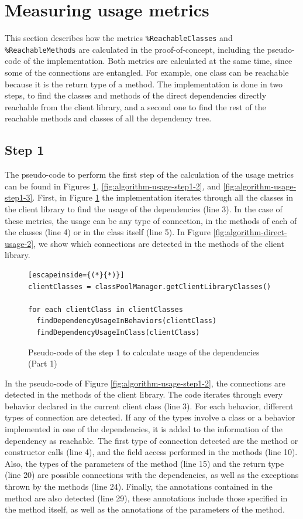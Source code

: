\section{Measuring usage metrics}
This section describes how the metrics \texttt{\%ReachableClasses} and \texttt{\%ReachableMethods} are calculated in the proof-of-concept, including the pseudo-code of the implementation. Both metrics are calculated at the same time, since some of the connections are entangled. For example, one class can be reachable because it is the return type of a method. The implementation is done in two steps, to find the classes and methods of the direct dependencies directly reachable from the client library, and a second one to find the rest of the reachable methods and classes of all the dependency tree.

\subsection{Step 1}
The pseudo-code to perform the first step of the calculation of the usage metrics can be found in Figures \ref{fig:algorithm-usage-step1-1}, \ref{fig:algorithm-usage-step1-2}, and \ref{fig:algorithm-usage-step1-3}. First, in Figure \ref{fig:algorithm-usage-step1-1} the implementation iterates through all the classes in the client library to find the usage of the dependencies (line 3). In the case of these metrics, the usage can be any type of connection, in the methods of each of the classes (line 4) or in the class itself (line 5). In Figure \ref{fig:algorithm-direct-usage-2}, we show which connections are detected in the methods of the client library.

\begin{figure}[ht!]
\begin{lstlisting}[escapeinside={(*}{*)}]
clientClasses = classPoolManager.getClientLibraryClasses()

for each clientClass in clientClasses
  findDependencyUsageInBehaviors(clientClass)
  findDependencyUsageInClass(clientClass)
\end{lstlisting}
\caption{Pseudo-code of the step 1 to calculate usage of the dependencies (Part 1)}
\label{fig:algorithm-usage-step1-1}
\end{figure}

In the pseudo-code of Figure \ref{fig:algorithm-usage-step1-2}, the connections are detected in the methods of the client library. The code iterates through every behavior declared in the current client class (line 3). For each behavior, different types of connection are detected. If any of the types involve a class or a behavior implemented in one of the dependencies, it is added to the information of the dependency as reachable. The first type of connection detected are the method or constructor calls (line 4), and the field access performed in the methods (line 10). Also, the types of the parameters of the method (line 15) and the return type (line 20) are possible connections with the dependencies, as well as the exceptions thrown by the methods (line 24). Finally, the annotations contained in the method are also detected (line 29), these annotations include those specified in the method itself, as well as the annotations of the parameters of the method.

